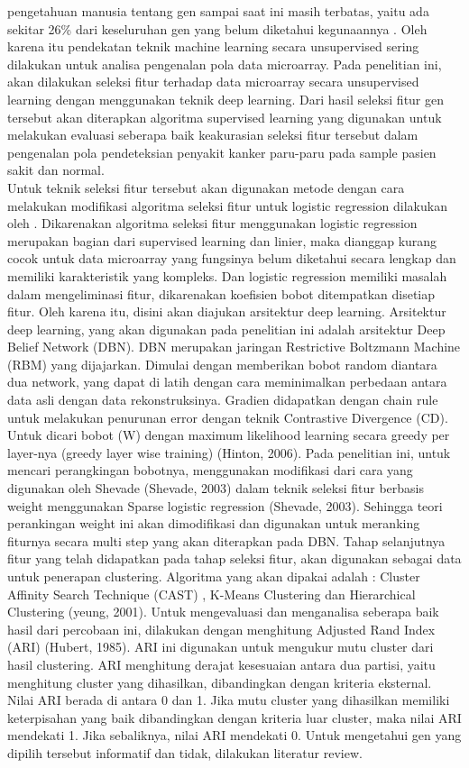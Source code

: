 pengetahuan manusia tentang gen sampai saat ini masih terbatas, yaitu ada sekitar 26\% dari keseluruhan gen yang belum diketahui kegunaannya \citep{haggstrom2014diagram}. Oleh karena itu pendekatan teknik machine learning secara unsupervised sering dilakukan untuk analisa pengenalan pola data microarray. Pada penelitian ini, akan dilakukan seleksi fitur terhadap data microarray secara unsupervised learning dengan menggunakan teknik deep learning. Dari hasil seleksi fitur gen tersebut akan diterapkan algoritma supervised learning yang digunakan untuk melakukan evaluasi seberapa baik keakurasian seleksi fitur tersebut dalam pengenalan pola pendeteksian penyakit kanker paru-paru pada sample pasien sakit dan normal. \\
Untuk teknik seleksi fitur tersebut akan digunakan metode dengan cara melakukan modifikasi algoritma seleksi fitur untuk logistic regression dilakukan oleh \cite{shevade2003simple}. 
Dikarenakan algoritma seleksi fitur menggunakan logistic regression merupakan bagian dari supervised learning dan linier, maka dianggap kurang cocok untuk data microarray yang fungsinya belum diketahui secara lengkap dan memiliki karakteristik yang kompleks. Dan logistic regression memiliki masalah dalam  mengeliminasi fitur, dikarenakan koefisien bobot ditempatkan disetiap fitur. Oleh karena itu, disini akan diajukan arsitektur deep learning.
Arsitektur deep learning, yang akan digunakan pada penelitian ini adalah arsitektur Deep Belief Network (DBN). DBN merupakan jaringan Restrictive Boltzmann Machine (RBM) yang dijajarkan. Dimulai dengan memberikan bobot random diantara dua network, yang dapat di latih dengan cara meminimalkan perbedaan antara data asli dengan data rekonstruksinya. Gradien didapatkan dengan chain rule untuk melakukan penurunan error dengan teknik Contrastive Divergence (CD). Untuk dicari bobot (W) dengan maximum likelihood learning  secara greedy per layer-nya (greedy layer wise training) (Hinton, 2006). Pada penelitian ini, untuk mencari perangkingan bobotnya, menggunakan modifikasi dari cara yang digunakan oleh Shevade (Shevade, 2003) dalam teknik seleksi fitur berbasis weight menggunakan Sparse logistic regression (Shevade, 2003). Sehingga teori perankingan weight ini akan dimodifikasi dan digunakan untuk  meranking fiturnya secara multi step yang akan diterapkan pada DBN.
Tahap selanjutnya fitur yang telah didapatkan pada tahap seleksi fitur, akan digunakan sebagai data untuk penerapan clustering. Algoritma yang akan dipakai adalah : Cluster Affinity Search Technique (CAST) , K-Means Clustering dan Hierarchical Clustering (yeung, 2001). Untuk mengevaluasi dan menganalisa seberapa baik hasil dari percobaan ini, dilakukan dengan menghitung Adjusted Rand Index (ARI) (Hubert, 1985). ARI ini digunakan untuk mengukur mutu cluster dari hasil clustering. ARI menghitung derajat kesesuaian antara dua partisi, yaitu menghitung cluster yang dihasilkan, dibandingkan dengan kriteria eksternal. Nilai ARI berada di antara 0 dan 1. Jika mutu cluster yang dihasilkan memiliki keterpisahan yang baik dibandingkan dengan kriteria luar cluster, maka nilai ARI mendekati 1. Jika sebaliknya, nilai ARI mendekati 0. Untuk mengetahui gen yang dipilih tersebut informatif dan tidak, dilakukan literatur review.
